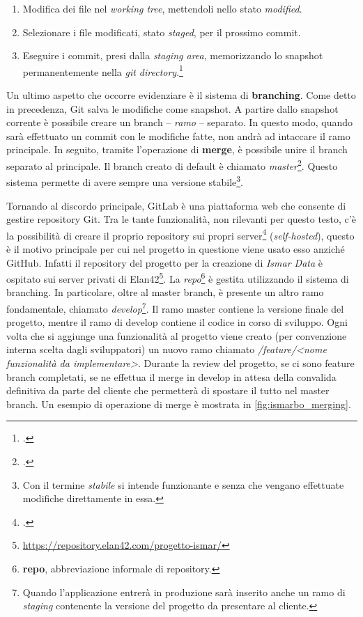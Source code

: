 \documentclass[./main.tex]{subfiles}
\begin{document}
\begin{enumerate}
    \item Modifica dei file nel \textit{working tree}, mettendoli nello stato \textit{modified}.
    \item Selezionare i file modificati, stato \textit{staged}, per il prossimo commit.
    \item Eseguire i commit, presi dalla \textit{staging area}, memorizzando lo snapshot permanentemente nella \textit{git directory}.\footcite[10-19]{straub-2014}
\end{enumerate}\par

Un ultimo aspetto che occorre evidenziare è il sistema di \textbf{branching}. Come detto in precedenza, Git salva le modifiche come snapshot. A partire dallo snapshot corrente è possibile creare un branch -- \textit{ramo} -- separato. In questo modo, quando sarà effettuato un commit con le modifiche fatte, non andrà ad intaccare il ramo principale. In seguito, tramite l'operazione di \textbf{merge}, è possibile unire il branch separato al principale. Il branch creato di default è chiamato \textit{master}\footcite[63-104]{straub-2014}. Questo sistema permette di avere sempre una versione stabile\footnote{Con il termine \textit{stabile} si intende funzionante e senza che vengano effettuate modifiche direttamente in essa.}.\par

Tornando al discordo principale, GitLab è una piattaforma web che consente di gestire repository Git. Tra le tante funzionalità, non rilevanti per questo testo, c'è la possibilità di creare il proprio repository sui propri server\footcite[\url{https://about.gitlab.com/why-gitlab/\#deployment}]{website-gitlab} (\textit{self-hosted}), questo è il motivo principale per cui nel progetto in questione viene usato esso anziché GitHub. Infatti il repository del progetto per la creazione di \textit{Ismar Data} è ospitato sui server privati di Elan42\footnote{\url{https://repository.elan42.com/progetto-ismar/}}. La \textit{repo}\footnote{\textbf{repo}, abbreviazione informale di repository.} è gestita utilizzando il sistema di branching. In particolare, oltre al master branch, è presente un altro ramo fondamentale, chiamato \textit{develop}\footnote{Quando l'applicazione entrerà in produzione sarà inserito anche un ramo di \textit{staging} contenente la versione del progetto da presentare al cliente.}. Il ramo master contiene la versione finale del progetto, mentre il ramo di develop contiene il codice in corso di sviluppo. Ogni volta che si aggiunge una funzionalità al progetto viene creato (per convenzione interna scelta dagli sviluppatori) un nuovo ramo chiamato \textit{/feature/<nome funzionalità da implementare>}. Durante la review del progetto, se ci sono feature branch completati, se ne effettua il merge in develop in attesa della convalida definitiva da parte del cliente che permetterà di spostare il tutto nel master branch. Un esempio di operazione di merge è mostrata in \autoref{fig:ismarbo_merging}.\par
\end{document}
